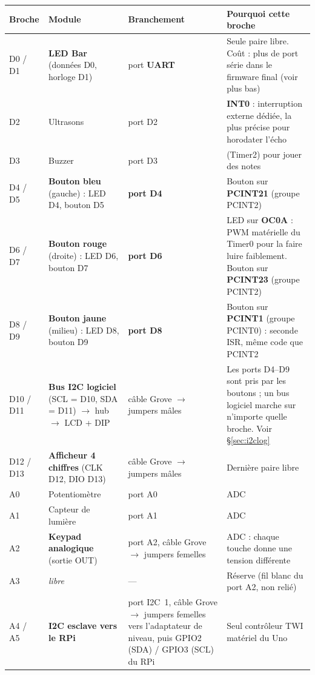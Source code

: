 \documentclass[11pt,a4paper]{article}
\newcommand{\code}[1]{\texttt{\detokenize{#1}}}
\begin{document}
\begin{center}\small
\begin{tabularx}{\linewidth}{P{1.5cm}P{4cm}P{3.2cm}L}
\toprule
\textbf{Broche} & \textbf{Module} & \textbf{Branchement} & \textbf{Pourquoi cette broche} \\
\midrule
D0 / D1 & \textbf{LED Bar} (données D0, horloge D1) & port \textbf{UART} & Seule paire libre. Coût : plus de port série dans le firmware final (voir plus bas) \\
D2 & Ultrasons & port D2 & \textbf{INT0} : interruption externe dédiée, la plus précise pour horodater l'écho \\
D3 & Buzzer & port D3 & \code{tone()} (Timer2) pour jouer des notes \\
D4 / D5 & \textbf{Bouton bleu} (gauche) : LED D4, bouton D5 & \textbf{port D4} & Bouton sur \textbf{PCINT21} (groupe PCINT2) \\
D6 / D7 & \textbf{Bouton rouge} (droite) : LED D6, bouton D7 & \textbf{port D6} & LED sur \textbf{OC0A} : PWM matérielle du Timer0 pour la faire luire faiblement. Bouton sur \textbf{PCINT23} (groupe PCINT2) \\
D8 / D9 & \textbf{Bouton jaune} (milieu) : LED D8, bouton D9 & \textbf{port D8} & Bouton sur \textbf{PCINT1} (groupe PCINT0) : seconde ISR, même code que PCINT2 \\
D10 / D11 & \textbf{Bus I2C logiciel} (SCL = D10, SDA = D11) $\to$ hub $\to$ LCD + DIP & câble Grove $\to$ jumpers mâles & Les ports D4--D9 sont pris par les boutons ; un bus logiciel marche sur n'importe quelle broche. Voir \S\ref{sec:i2clog} \\
D12 / D13 & \textbf{Afficheur 4 chiffres} (CLK D12, DIO D13) & câble Grove $\to$ jumpers mâles & Dernière paire libre \\
A0 & Potentiomètre & port A0 & ADC \\
A1 & Capteur de lumière & port A1 & ADC \\
A2 & \textbf{Keypad analogique} (sortie OUT) & port A2, câble Grove $\to$ jumpers femelles & ADC : chaque touche donne une tension différente \\
A3 & \emph{libre} & --- & Réserve (fil blanc du port A2, non relié) \\
A4 / A5 & \textbf{I2C esclave vers le RPi} & port I2C~1, câble Grove $\to$ jumpers femelles vers l'adaptateur de niveau, puis GPIO2 (SDA) / GPIO3 (SCL) du RPi & Seul contrôleur TWI matériel du Uno \\
\bottomrule
\end{tabularx}
\end{center}
\end{document}
